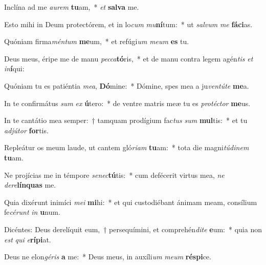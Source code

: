 \item Inclína ad me \textit{au}\textit{rem} \textbf{tu}am,~* \textit{et} \textbf{sal}\textbf{va} me.
\item Esto mihi in Deum protectórem, et in lo\textit{cum} \textit{mu}\textbf{ní}tum:~* ut \textit{sal}\textit{vum} \textit{me} \textbf{fá}\textbf{ci}as.
\item Quóniam firma\textit{mén}\textit{tum} \textbf{me}um,~* et refúgi\textit{um} \textit{me}\textit{um} \textbf{es} tu.
\item Deus meus, éripe me de manu \textit{pec}\textit{ca}\textbf{tó}ris,~* et de manu contra legem agén\textit{tis} \textit{et} \textit{in}\textbf{í}qui:
\item Quóniam tu es patiéntia \textit{me}\textit{a}, \textbf{Dó}mine:~* Dómine, spes mea a ju\textit{ven}\textit{tú}\textit{te} \textbf{me}a.
\item In te confirmátus \textit{sum} \textit{ex} \textbf{ú}tero:~* de ventre matris meæ tu es \textit{pro}\textit{téc}\textit{tor} \textbf{me}us.
\item In te cantátio mea semper:~† tamquam prodígium fac\textit{tus} \textit{sum} \textbf{mul}tis:~* et tu \textit{ad}\textit{jú}\textit{tor} \textbf{for}tis.
\item Repleátur os meum laude, ut cantem gló\textit{ri}\textit{am} \textbf{tu}am:~* tota die magni\textit{tú}\textit{di}\textit{nem} \textbf{tu}am.
\item Ne projícias me in témpore \textit{se}\textit{nec}\textbf{tú}tis:~* cum defécerit virtus mea, \textit{ne} \textit{de}\textit{re}\textbf{lín}\textbf{quas} me.
\item Quia dixérunt inimíci \textit{me}\textit{i} \textbf{mi}hi:~* et qui custodiébant ánimam meam, consílium fe\textit{cé}\textit{runt} \textit{in} \textbf{u}num.
\item Dicéntes: Deus derelíquit eum,~† persequímini, et comprehén\textit{di}\textit{te} \textbf{e}um:~* quia non \textit{est} \textit{qui} \textit{e}\textbf{rí}\textbf{pi}at.
\item Deus ne elon\textit{gé}\textit{ris} \textbf{a} me:~* Deus meus, in auxíli\textit{um} \textit{me}\textit{um} \textbf{ré}\textbf{spi}ce.
